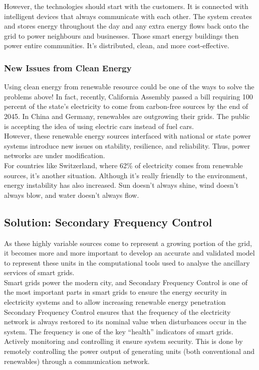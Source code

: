However, the technologies should start with the customers. It is connected with intelligent devices that always communicate with each other. The system creates and stores energy throughout the day and any extra energy flows back onto the grid to power neighbours and businesses. Those smart energy buildings then power entire communities. It’s distributed, clean, and more cost-effective.\\

\subsubsection{New Issues from Clean Energy}
Using clean energy from renewable resource could be one of the ways to solve the problems above! In fact, recently, California Assembly passed a bill requiring 100 percent of the state’s electricity to come from carbon-free sources by the end of 2045. In China and Germany, renewables are outgrowing their grids. The public is accepting the idea of using electric cars instead of fuel cars.\\

However, these renewable energy sources interfaced with national or state power systems introduce new issues on stability, resilience, and reliability. Thus, power networks are under modification.\\

For countries like Switzerland, where 62\% of electricity comes from renewable sources, it’s another situation. Although it’s really friendly to the environment, energy instability has also increased. Sun doesn’t always shine, wind doesn’t always blow, and water doesn’t always flow.\\

\subsection{Solution: Secondary Frequency Control}
As these highly variable sources come to represent a growing portion of the grid, it becomes more and more important to develop an accurate and validated model to represent these units in the computational tools used to analyse the ancillary services of smart grids.\\

Smart grids power the modern city, and Secondary Frequency Control is one of the most important parts in smart grids to ensure the energy security in electricity systems and to allow increasing renewable energy penetration\\

Secondary Frequency Control ensures that the frequency of the electricity network is always restored to its nominal value when disturbances occur in the system. The frequency is one of the key “health” indicators of smart grids. Actively monitoring and controlling it ensure system security. This is done by remotely controlling the power output of generating units (both conventional and renewables) through a communication network.\\